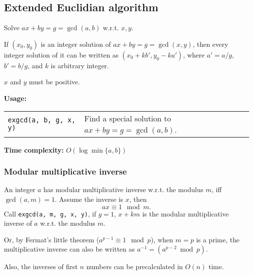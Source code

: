\subsection{Extended Euclidian algorithm} %
Solve $ax + by = g = \gcd(a,b)$ w.r.t. $x, y$. \par
If $(x_0, y_0)$ is an integer solution of $ax + by = g = \gcd(x,y)$, then every integer solution of it can be written as $(x_0 + kb', y_0 - ka')$, where $a' = a/g$, $b' = b/g$, and $k$ is arbitrary integer. \par
\Warning $x$ and $y$ must be positive. \par
\textbf{Usage:} \\[0.1cm]
\begin{tabular}{p{4cm} p{7cm}}
  \lstinline|exgcd(a, b, g, x, y)| & Find a special solution to $ax + by = g = \gcd(a, b)$. \\
\end{tabular} \par
\textbf{Time complexity:} $O(\log \min \{a,b\})$ \par


\subsubsection{Modular multiplicative inverse}
An integer $a$ has modular multiplicative inverse w.r.t. the modulus $m$, iff $\gcd(a, m) = 1$. Assume the inverse is $x$, then
$$ ax \equiv 1 \mod m \text{.}$$
Call \lstinline|exgcd(a, m, g, x, y)|, if $g = 1$, $x + km$ is the modular multiplicative inverse of $a$ w.r.t. the modulus $m$. \par
 \par
Or, by Fermat's little theorem ($a^{p-1} \equiv 1 \mod p$), when $m=p$ is a prime, the multiplicative inverse can also be written as
$a^{-1} = \left(a^{p-2} \bmod p\right) \text{.}$ \par
Also, the inverses of first $n$ numbers can be precalculated in $O(n)$ time.


